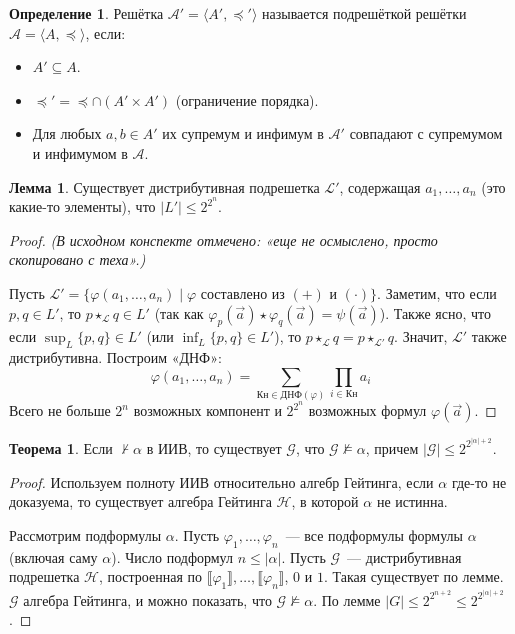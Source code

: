 \documentclass[a4paper,11pt]{article}
\theoremstyle{definition}
\newtheorem*{thm}{Теорема}
\newtheorem*{lmm}{Лемма}
\newtheorem*{dfn}{Определение}
\begin{document}
\begin{dfn}
Решётка $\mathcal{A}' = \langle A', \preceq'\rangle$ называется подрешёткой
решётки $\mathcal{A} = \langle A, \preceq\rangle$, если:
\begin{itemize}
\item $A' \subseteq A$.
\item $\preceq' = \preceq \cap (A' \times A')$ (ограничение порядка).
\item Для любых $a, b \in A'$ их супремум и инфимум в $\mathcal{A}'$ совпадают с
  супремумом и инфимумом в $\mathcal{A}$.
\end{itemize}
\end{dfn}

\begin{lmm}
Существует дистрибутивная подрешетка $\mathcal{L}'$, содержащая $a_1, \dots,
a_n$ (это какие-то элементы), что $|L'| \le 2^{2^n}$.
\end{lmm}
\begin{proof}
\emph{(В исходном конспекте отмечено: «еще не осмыслено, просто скопировано с
теха».)}

Пусть $\mathcal{L}' = \{\varphi(a_1, \dots, a_n) \mid \varphi$ составлено из
$(+)$ и $(\cdot)\}$. Заметим, что если $p, q \in L'$, то $p \star_{\mathcal{L}} q
\in L'$ (так как $\varphi_p(\vec a) \star \varphi_q(\vec a) = \psi(\vec a)$).
Также ясно, что если $\sup_L\{p, q\} \in L'$ (или $\inf_L\{p, q\} \in L'$), то $p
\star_{\mathcal{L}} q = p \star_{\mathcal{L}'} q$. Значит, $\mathcal{L}'$ также
дистрибутивна. Построим «ДНФ»:
\[
\varphi(a_1, \dots, a_n) = \sum_{\text{Кн} \in \text{ДНФ}(\varphi)} \prod_{i \in \text{Кн}} a_i
\]
Всего не больше $2^n$ возможных компонент и $2^{2^n}$ возможных формул
$\varphi(\vec a)$.
\end{proof}

\begin{thm}
Если $\nvdash \alpha$ в ИИВ, то существует $\mathcal{G}$, что $\mathcal{G}
\not\models \alpha$, причем $|\mathcal{G}| \le 2^{2^{|\alpha|+2}}$.
\end{thm}
\begin{proof}
Используем полноту ИИВ относительно алгебр Гейтинга, если $\alpha$ где-то не
доказуема, то существует алгебра Гейтинга $\mathcal{H}$, в которой $\alpha$ не
истинна.

Рассмотрим подформулы $\alpha$. Пусть $\varphi_1, \dots, \varphi_n$~--- все
подформулы формулы $\alpha$ (включая саму $\alpha$). Число подформул $n \le
|\alpha|$. Пусть $\mathcal{G}$~--- дистрибутивная подрешетка $\mathcal{H}$,
построенная по $\llbracket\varphi_1\rrbracket, \dots, \llbracket\varphi_n\rrbracket$,
$0$ и $1$. Такая существует по лемме. $\mathcal{G}$ алгебра Гейтинга, и можно
показать, что $\mathcal{G} \not\models \alpha$. По лемме $|G| \le 2^{2^{n+2}}
\le 2^{2^{|\alpha|+2}}$.
\end{proof}
\end{document}
